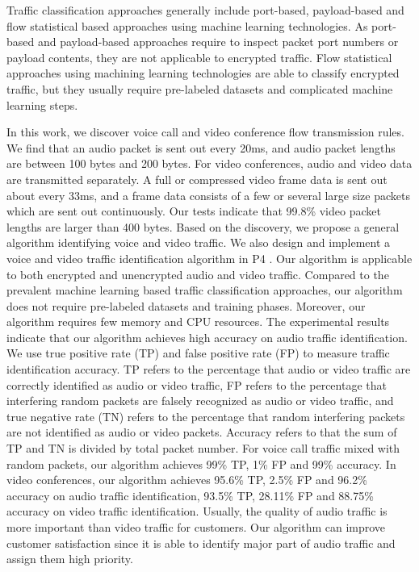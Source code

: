 \documentclass[master]{thesis}
\begin{document}
Traffic classification approaches generally include port-based, payload-based and flow statistical based approaches using machine learning technologies. As port-based and payload-based approaches require to inspect packet port numbers or payload contents, they are not applicable to encrypted traffic. Flow statistical approaches using machining learning technologies are able to classify encrypted traffic, but they usually require pre-labeled datasets and complicated machine learning steps.  

In this work, we discover voice call and video conference flow transmission rules. We find that an audio packet is sent out every 20ms, and audio packet lengths are between 100 bytes and 200 bytes. For video conferences, audio and video data are transmitted separately. A full or compressed video frame data is sent out about every 33ms, and a frame data consists of a few or several large size packets which are sent out continuously. Our tests indicate that 99.8\% video packet lengths are larger than 400 bytes. Based on the discovery, we propose a general algorithm identifying voice and video traffic. We also design and implement a voice and video traffic identification algorithm in P4 \cite{bosshart2014p4}. Our algorithm is applicable to both encrypted and unencrypted audio and video traffic. Compared to the prevalent machine learning based traffic classification approaches, our algorithm does not require pre-labeled datasets and training phases. Moreover, our algorithm requires few memory and CPU resources. The experimental results indicate that our algorithm achieves high accuracy on audio traffic identification. We use true positive rate (TP) and false positive rate (FP) to measure traffic identification accuracy. TP refers to the percentage that audio or video traffic are correctly identified as audio or video traffic, FP refers to the percentage that interfering random packets are falsely recognized as audio or video traffic, and true negative rate (TN) refers to the percentage that random interfering packets are not identified as audio or video packets. Accuracy refers to that the sum of TP and TN is divided by total packet number. For voice call traffic mixed with random packets, our algorithm achieves 99\% TP, 1\% FP and 99\% accuracy. In video conferences, our algorithm achieves 95.6\% TP, 2.5\% FP and 96.2\% accuracy on audio traffic identification, 93.5\% TP, 28.11\% FP and 88.75\% accuracy on video traffic identification. Usually, the quality of audio traffic is more important than video traffic for customers. Our algorithm can improve customer satisfaction since it is able to identify major part of audio traffic and assign them high priority. 
\end{document}
